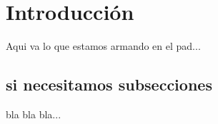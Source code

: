 \chapter{Introducción}

Aqui va lo que estamos armando en el pad... 
 
\section{si necesitamos subsecciones}

bla bla bla...
